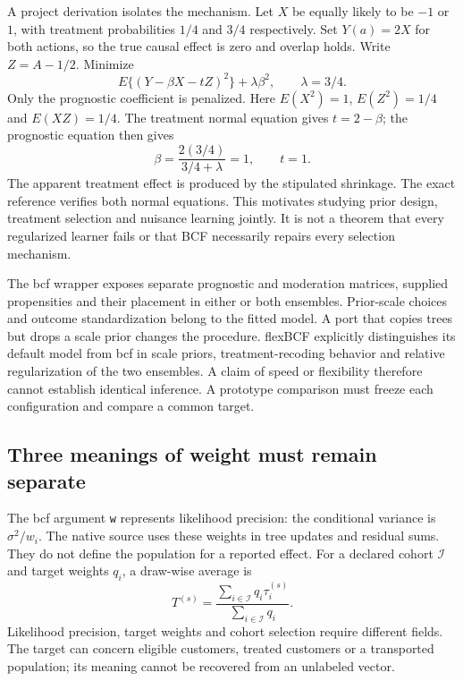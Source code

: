 A project derivation isolates the mechanism. Let $X$ be equally likely to be $-1$ or $1$, with treatment probabilities $1/4$ and $3/4$ respectively. Set $Y(a)=2X$ for both actions, so the true causal effect is zero and overlap holds. Write $Z=A-1/2$. Minimize
\begin{equation}
 E\{(Y-\beta X-tZ)^2\}+\lambda\beta^2,
 \qquad \lambda=3/4.
 \label{exec21:cxx-shrink-objective}
\end{equation}
Only the prognostic coefficient is penalized. Here $E(X^2)=1$, $E(Z^2)=1/4$ and $E(XZ)=1/4$. The treatment normal equation gives $t=2-\beta$; the prognostic equation then gives
\begin{equation}
 \beta=\frac{2(3/4)}{3/4+\lambda}=1,
 \qquad t=1.
 \label{exec21:cxx-shrink-result}
\end{equation}
The apparent treatment effect is produced by the stipulated shrinkage. The exact reference verifies both normal equations. This motivates studying prior design, treatment selection and nuisance learning jointly. It is not a theorem that every regularized learner fails or that BCF necessarily repairs every selection mechanism.~\citep{exec21_cxx_reference,exec21_cxx_hahn}

The bcf wrapper exposes separate prognostic and moderation matrices, supplied propensities and their placement in either or both ensembles. Prior-scale choices and outcome standardization belong to the fitted model. A port that copies trees but drops a scale prior changes the procedure. flexBCF explicitly distinguishes its default model from bcf in scale priors, treatment-recoding behavior and relative regularization of the two ensembles. A claim of speed or flexibility therefore cannot establish identical inference. A prototype comparison must freeze each configuration and compare a common target.~\citep{exec21_cxx_bcf,exec21_cxx_flexbcf}

\subsection{Three meanings of weight must remain separate}
\label{exec21:cxx-weights}
The bcf argument \texttt{w} represents likelihood precision: the conditional variance is $\sigma^2/w_i$. The native source uses these weights in tree updates and residual sums. They do not define the population for a reported effect. For a declared cohort $\mathcal I$ and target weights $q_i$, a draw-wise average is
\begin{equation}
 T^{(s)}=\frac{\sum_{i\in\mathcal I}q_i\tau_i^{(s)}}{\sum_{i\in\mathcal I}q_i}.
 \label{exec21:cxx-aggregate}
\end{equation}
Likelihood precision, target weights and cohort selection require different fields. The target can concern eligible customers, treated customers or a transported population; its meaning cannot be recovered from an unlabeled vector.~\citep{exec21_cxx_bcf,exec21_cxx_flexbcf}

